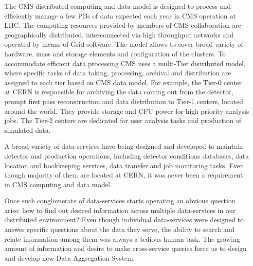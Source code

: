 \documentclass[1p,times]{elsarticle}
\begin{document}
The CMS distributed computing and data model \cite{CMSDataModel} 
is designed to process
and efficiently manage a few PBs of data expected each year
in CMS operation at LHC. The computing resources provided by members of CMS
collaboration are geographically distributed, 
interconnected via high throughput networks and operated by means 
of Grid software. The model allows to cover broad variety of
hardware, mass and storage elements and configuration of the
clusters. To accommodate efficient data processing CMS uses
a multi-Tier distributed model, where specific tasks of data taking,
processing, archival and distribution are assigned to each tier based
on CMS data model. For example, the Tier-0 center at CERN is responsible
for archiving the data coming out from the detector, prompt first pass reconstruction
and data distribution to Tier-1 centers, located around the world.
They provide storage and CPU power for high priority analysis jobs.
The Tier-2 centers
are dedicated for user analysis tasks and production of simulated data.

A broad variety of data-services have being designed and developed to
maintain detector and production operations, including detector
conditions databases, data location and bookkeeping services,
data transfer and job monitoring tasks. Even though majority of them
are located at CERN, it was never been a requirement in CMS computing
and data model. 

Once such conglomerate of data-services starts operating an obvious
question arise: how to find out desired information across multiple data-services
in our distributed environment? Even though individual data-services were designed
to answer specific questions about the data they serve, the ability to search and relate
information among them was always a tedious human task. The growing amount of information
and desire to make cross-service queries force us to design and develop new
Data Aggregation System.
\end{document}
